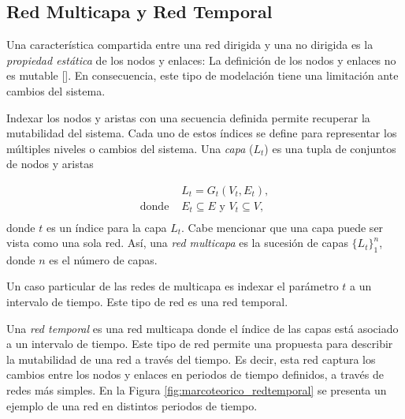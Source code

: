 \documentclass[../main.tex]{subfiles}
\begin{document}
\subsection{Red Multicapa y Red Temporal} 

Una característica compartida entre una red dirigida y una no dirigida es la \textit{propiedad estática} de los nodos y enlaces: La definición de los nodos y enlaces no es mutable [\cite{McGlohon2011}]. En consecuencia, este tipo de modelación tiene una limitación ante cambios del sistema. 


Indexar los nodos y aristas con una secuencia definida permite recuperar la mutabilidad del sistema. Cada uno de estos índices se define para representar los múltiples niveles o cambios del sistema. 
Una \textit{capa} ($L_{t}$) es una tupla de conjuntos de nodos y aristas

\begin{align*}
     & L_{t} = G_{t} (V_{t}, E_{t}),\\
    \text{donde } & E_{t} \subseteq E \text{ y }
    V_{t} \subseteq V ,\\
\end{align*}
donde $t$ es un índice para la capa $L_{t}$. Cabe mencionar que una capa puede ser vista como una sola red. Así, una \textit{red multicapa} es la sucesión de capas $\{L_{t}\}_{1}^{n}$, donde $n$ es el número de capas.

Un caso particular de las redes de multicapa es indexar el parámetro $t$ a un intervalo de tiempo. Este tipo de red es una red temporal.

Una \textit{red temporal} es una red multicapa donde el índice de las capas está asociado a un intervalo de tiempo. Este tipo de red permite una propuesta para describir la mutabilidad de una red a través del tiempo.  Es decir, esta red captura los cambios entre los  nodos y enlaces en periodos de tiempo definidos, a través de redes más simples. En la Figura \ref{fig:marcoteorico_redtemporal} se presenta un ejemplo de una red en distintos periodos de tiempo.



\end{document}
